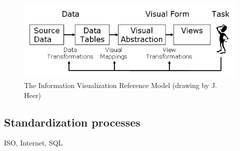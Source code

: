 \begin{figure}
\includegraphics[width=\columnwidth]{figures/reference_model}
\caption{The Information Visualization Reference Model (drawing by
  J. Heer)}
\label{fig:refmodel}
\end{figure}


\subsection{Standardization processes}
ISO, Internet, SQL





